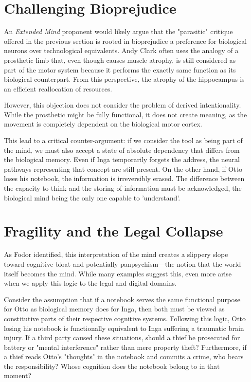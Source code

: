 \documentclass[12pt]{article}
\begin{document}
\section{Challenging Bioprejudice}

An \textit{Extended Mind} proponent would likely argue that the "parasitic" critique offered in the 
previous section is rooted in bioprejudice \textemdash a preference for biological neurons
over technological equivalents. Andy Clark often uses the analogy of a prosthetic limb that,
even though causes muscle atrophy, is still considered as part of the motor system because it 
performs the exactly same function as its biological counterpart.  From this perspective, the atrophy
of the hippocampus is an efficient reallocation of resources.

However, this objection does not consider the problem of derived intentionality. While the 
prosthetic might be fully functional, it does not create meaning, as the movement is completely
dependent on the biological motor cortex.

This lead to a critical counter-argument: if we consider the tool as being part of the mind, we 
must also accept a state of absolute dependency that differs from the biological memory. 
Even if Inga temporarily forgets the address, the neural pathways representing that concept are 
still present. On the other hand, if Otto loses his notebook, the information is irreversibly 
erased. The difference between the capacity to think and the storing of information must be 
acknowledged, the biological mind being the only one capable to 'understand'.

\section{Fragility and the Legal Collapse}
As Fodor identified, this interpretation of the mind creates a slippery slope toward 
cognitive bloat \parencite{fodor2009} \textemdash and potentially panpsychism—the notion that the world itself becomes the mind. 
While many examples suggest this, even more arise when we apply this logic to the legal and 
digital domains.

Consider the assumption that if a notebook serves the same functional purpose for Otto as
biological memory does for Inga, then both must be viewed as constitutive parts of their 
respective cognitive systems. Following this logic, Otto losing his notebook is functionally 
equivalent to Inga suffering a traumatic brain injury. If a third party caused these situations,
should a thief be prosecuted for battery or "mental interference" rather than mere property 
theft? Furthermore, if a thief reads Otto's "thoughts" in the notebook and commits a crime, 
who bears the responsibility? Whose cognition does the notebook belong to in that moment?
\end{document}
